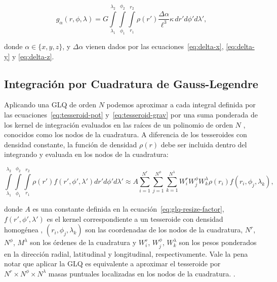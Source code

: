\begin{equation}
    g_{\alpha}(r,\phi,\lambda) = G
    \int\limits_{\lambda_1}^{\lambda_2}
    \int\limits_{\phi_1}^{\phi_2}
    \int\limits_{r_1}^{r_2}
    \rho(r') \frac{\Delta\alpha}{\ell^3}
    \kappa \, dr' d\phi' d\lambda',
\label{eq:tesseroid-grav}
\end{equation}

\noindent donde $\alpha \in \{x, y, z\}$, y $\Delta \alpha$ vienen dados por
las ecuaciones~\ref{eq:delta-x}, \ref{eq:delta-y} y \ref{eq:delta-z}.

\subsection{Integración por Cuadratura de Gauss-Legendre}

Aplicando una \ac{GLQ} de orden $N$ podemos aproximar a cada integral definida
por las ecuaciones~\ref{eq:tesseroid-pot} y~\ref{eq:tesseroid-grav} por una
suma ponderada de los kernel de integración evaluados en las raíces de un
polinomio de orden $N$ \citep[p.~390]{hildebrand1987}, conocidos como los nodos
de la cuadratura.
A diferencia de los tesseroides con densidad constante, la función de densidad
$\rho(r)$ debe ser incluida dentro del integrando y evaluada en los nodos de la
cuadratura:

\begin{equation}
        \int\limits_{\lambda_1}^{\lambda_2}
        \int\limits_{\phi_1}^{\phi_2}
        \int\limits_{r_1}^{r_2}
        \rho(r') f(r', \phi', \lambda')
        dr' d\phi' d\lambda' \approx
        A
        \sum\limits_{i=1}^{N^r}
        \sum\limits_{j=1}^{N^\phi}
        \sum\limits_{k=1}^{N^\lambda}
        W_i^r W_j^\phi W_k^\lambda
        \rho(r_i) f(r_i, \phi_j, \lambda_k),
\label{eq:glq-var-dens}
\end{equation}

\noindent donde $A$ es una constante definida en la
ecuación~\ref{eq:glq-resize-factor}, $f(r', \phi', \lambda')$ es el kernel
correspondiente a un tesseroide con densidad homogénea \citep{grombein2013},
$(r_i, \phi_j, \lambda_k)$ son las coordenadas de los nodos de la cuadratura,
$N^r$, $N^\phi$, $M^\lambda$ son los órdenes de la cuadratura y $W_i^r$,
$W_j^\phi$, $W_k^\lambda$ son los pesos ponderados en la dirección radial,
latitudinal y longitudinal, respectivamente.
Vale la pena notar que aplicar la \ac{GLQ} es equivalente a aproximar el
tesseroide por $N^r \times N^\phi \times N^\lambda$ masas puntuales localizadas
en los nodos de la cuadratura. \citep{ku1977, asgharzadeh2007}.


